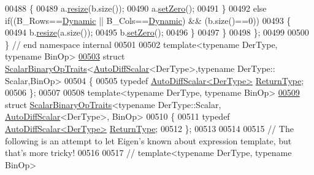 \begin{DoxyCode}
00488     \{
00489       a.\hyperlink{class_eigen_1_1_plain_object_base_a99d9054ee2d5a40c6e00ded0265e9cea}{resize}(b.size());
00490       a.\hyperlink{class_eigen_1_1_plain_object_base_ac21ad5f989f320e46958b75ac8d9a1da}{setZero}();
00491     \}
00492     \textcolor{keywordflow}{else} \textcolor{keywordflow}{if}((B\_Rows==\hyperlink{namespace_eigen_ad81fa7195215a0ce30017dfac309f0b2}{Dynamic} || B\_Cols==\hyperlink{namespace_eigen_ad81fa7195215a0ce30017dfac309f0b2}{Dynamic}) && (b.size()==0))
00493     \{
00494       b.\hyperlink{class_eigen_1_1_plain_object_base_a99d9054ee2d5a40c6e00ded0265e9cea}{resize}(a.size());
00495       b.\hyperlink{class_eigen_1_1_plain_object_base_ac21ad5f989f320e46958b75ac8d9a1da}{setZero}();
00496     \}
00497   \}
00498 \};
00499 
00500 \} \textcolor{comment}{// end namespace internal}
00501 
00502 \textcolor{keyword}{template}<\textcolor{keyword}{typename} DerType, \textcolor{keyword}{typename} BinOp>
\hyperlink{struct_eigen_1_1_scalar_binary_op_traits_3_01_auto_diff_scalar_3_01_der_type_01_4_00_01typename_8029eb4becd448e88ba5e4cb75a4dd2b}{00503} \textcolor{keyword}{struct }\hyperlink{group___core___module_struct_eigen_1_1_scalar_binary_op_traits}{ScalarBinaryOpTraits}<\hyperlink{class_eigen_1_1_auto_diff_scalar}{AutoDiffScalar}<DerType>,typename DerType::
      Scalar,BinOp>
00504 \{
00505   \textcolor{keyword}{typedef} \hyperlink{class_eigen_1_1_auto_diff_scalar}{AutoDiffScalar<DerType>} \hyperlink{class_eigen_1_1_auto_diff_scalar}{ReturnType};
00506 \};
00507 
00508 \textcolor{keyword}{template}<\textcolor{keyword}{typename} DerType, \textcolor{keyword}{typename} BinOp>
\hyperlink{struct_eigen_1_1_scalar_binary_op_traits_3_01typename_01_der_type_1_1_scalar_00_01_auto_diff_sca5c26207d328bbaa3069a04f38248d36b}{00509} \textcolor{keyword}{struct }\hyperlink{group___core___module_struct_eigen_1_1_scalar_binary_op_traits}{ScalarBinaryOpTraits}<typename DerType::Scalar,
      \hyperlink{class_eigen_1_1_auto_diff_scalar}{AutoDiffScalar}<DerType>, BinOp>
00510 \{
00511   \textcolor{keyword}{typedef} \hyperlink{class_eigen_1_1_auto_diff_scalar}{AutoDiffScalar<DerType>} \hyperlink{class_eigen_1_1_auto_diff_scalar}{ReturnType};
00512 \};
00513 
00514 
00515 \textcolor{comment}{// The following is an attempt to let Eigen's known about expression template, but that's more tricky!}
00516 
00517 \textcolor{comment}{// template<typename DerType, typename BinOp>}

\end{DoxyCode}
